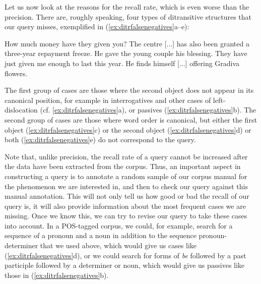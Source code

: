 Let us now look at the reasons for the recall  rate, which is even worse than the precision.  There are, roughly speaking, four types of ditransitive  structures that our query  misses, exemplified in (\ref{ex:ditrfalsenegatives}a--e):

\begin{exe}
\ex
\begin{xlist}
\label{ex:ditrfalsenegatives}
\ex How much money have they given you?
\ex The centre [...] has also been granted a three\hyp{}year repayment freeze.
\ex He gave the young couple his blessing.
\ex They have just given me enough to last this year.
\ex He finds himself [...] offering Gradiva flowers.
\end{xlist}
\end{exe}

The first group of cases are those where the second object does not appear in its canonical position, for example in interrogatives and other cases of left\hyp{}dislocation (cf. \ref{ex:ditrfalsenegatives}a), or passives  (\ref{ex:ditrfalsenegatives}b). The second group of cases are those where word order  is canonical, but either the first object (\ref{ex:ditrfalsenegatives}c) or the second object (\ref{ex:ditrfalsenegatives}d) or both (\ref{ex:ditrfalsenegatives}e) do not correspond to the  query.

Note that, unlike precision,  the recall  rate of a query  cannot be increased after the data have been extracted  from the corpus. Thus, an important aspect in constructing a query is to annotate  a random sample  of our corpus manual  for the phenomenon we are interested in, and then to check our query against this manual annotation.  This will not only tell us how good or bad the recall of our query is, it will also provide information about the most frequent cases we are missing. Once we know this, we can try to revise our query  to take these cases into account. In a POS\hyp{}tagged  corpus, we could, for example, search for a sequence of a pronoun  and a noun  in addition to the sequence pronoun\hyp{}determiner  that we used above, which would give us cases like (\ref{ex:ditrfalsenegatives}d), or we could search for forms of \textit{be} followed by a past participle followed by a determiner or noun, which would give us passives  like those in (\ref{ex:ditrfalsenegatives}b).

